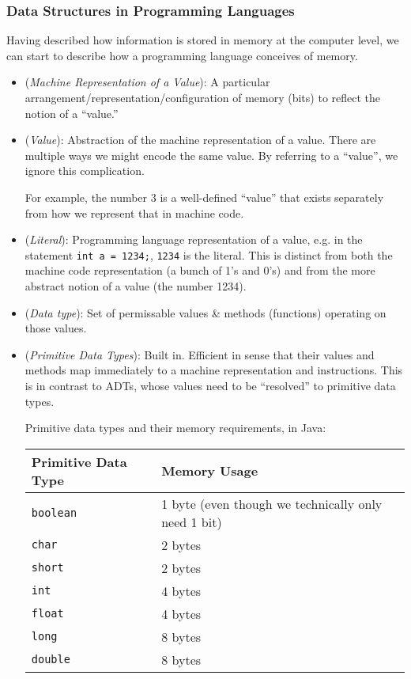 \documentclass[12pt]{article}
\theoremstyle{plain}
\theoremstyle{definition}
\theoremstyle{remark}
\begin{document}
\clearpage
\subsubsection{Data Structures in Programming Languages}

Having described how information is stored in memory at the computer
level, we can start to describe how a programming language conceives of
memory.
\begin{itemize}
  \item (\emph{Machine Representation of a Value}):
    A particular arrangement/representation/configuration of memory
    (bits) to reflect the notion of a ``value.''

  \item (\emph{Value}):
    Abstraction of the machine representation of a value.
    There are multiple ways we might encode the same value.
    By referring to a ``value'', we ignore this complication.

    For example, the number 3 is a well-defined ``value'' that
    exists separately from how we represent that in machine code.

  \item (\emph{Literal}):
    Programming language representation of a
    value, e.g. in the statement \texttt{int a = 1234;}, \texttt{1234}
    is the literal.
    This is distinct from both the machine code representation (a bunch
    of 1's and 0's) and from the more abstract notion of a value (the
    number 1234).

  \item (\emph{Data type}): Set of permissable values \& methods
    (functions) operating on those values.

  \item (\emph{Primitive Data Types}):
    Built in.
    Efficient in sense that their values and methods map immediately to a
    machine representation and instructions.
    This is in contrast to ADTs, whose values need to be ``resolved'' to
    primitive data types.

    Primitive data types and their memory requirements, in Java:
    \begin{table}[htpb!]
    \centering
    \begin{tabular}{l|l}
      Primitive Data Type & Memory Usage \\\hline\hline
      \texttt{boolean}
        & 1 byte (even though we technically only need 1 bit)
        \\
      \texttt{char}   & 2 bytes
        \\
      \texttt{short}  & 2 bytes
        \\
      \texttt{int}    & 4 bytes
        \\
      \texttt{float}  & 4 bytes
        \\
      \texttt{long}   & 8 bytes
        \\
      \texttt{double} & 8 bytes
    \end{tabular}
    \end{table}


\end{itemize}
\end{document}
